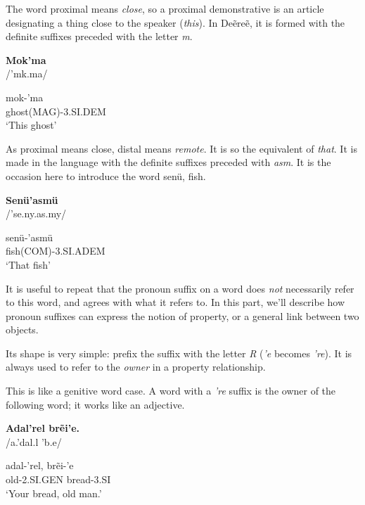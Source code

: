 The word proximal means \emph{close}, so a proximal demonstrative is an article designating a thing
close to the speaker (\emph{this}). In Deẽreẽ, it is formed with the definite suffixes preceded with
the letter \emph{m}.

\begin{exe}
\ex\label{exe:person-prox-dem}
\textbf{Mok’ma}\\
/'m{\ipaO}k.ma/

\gll mok-’ma\\
ghost(MAG)-3.SI.DEM\\
\trans ‘This ghost’
\end{exe}

As proximal means close, distal means \emph{remote}. It is so the equivalent of \emph{that}. It is
made in the language with the definite suffixes preceded with \emph{asm}. It is the occasion here to
introduce the word \gls{senü}, fish.

\begin{exe}
\ex\label{exe:person-dist-dem}
\textbf{Senü’asmü}\\
/'se.ny.as.my/

\gll \gls{senü}-’asmü\\
fish(COM)-3.SI.ADEM\\
\trans ‘That fish’
\end{exe}

It is useful to repeat that the pronoun suffix on a word does \emph{not} necessarily refer to this
word, and agrees with what it refers to. In this part, we’ll describe how pronoun suffixes can
express the notion of property, or a general link between two objects.

Its shape is very simple: prefix the suffix with the letter \emph{R} (\emph{’e} becomes \emph{’re}).
It is always used to refer to the \emph{owner} in a property relationship.

This is like a genitive word case. A word with a \emph{’re} suffix is the owner of the following
word; it works like an adjective.

\begin{exe}
\ex\label{exe:person-gen-2obj}
\textbf{Adal’rel brẽi’e.}\\
/a.'dal.{\ipaR\ipaE}l 'b{\ipaR\ipaET}.e/

\gll \gls{adal}-’rel, \gls{brẽi}-’e\\
old-2.SI.GEN bread-3.SI\\
\trans ‘Your bread, old man.’
\end{exe}


